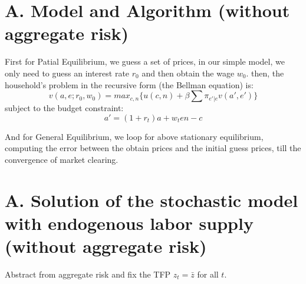 
% 


\section{A. Model and Algorithm (without aggregate risk)}

First for {\color{red}Patial Equilibrium}, we guess a set of prices, in our simple model, we only need to guess an interest rate $r_0$ and then obtain the wage $w_0$. 
then, the household's problem in the recursive form (the Bellman equation) is:
\[
v(a,e;r_0,w_0)=max_{c,n} \{ u(c,n) + \beta \sum \pi_{e'|e} v(a',e')\}
\]
subject to the budget constraint: 
\[ 
a' = (1+r_t)a + w_t e n - c
\]

And for {\color{red} General Equilibrium}, we loop for above stationary equilibrium, computing the error between the obtain prices and the initial guess prices, till the convergence of market clearing.



\section{A. Solution of the stochastic model with endogenous labor supply (without aggregate risk)}
Abstract from aggregate risk and fix  the TFP $z_t = \bar{z}$ for all $t$.


